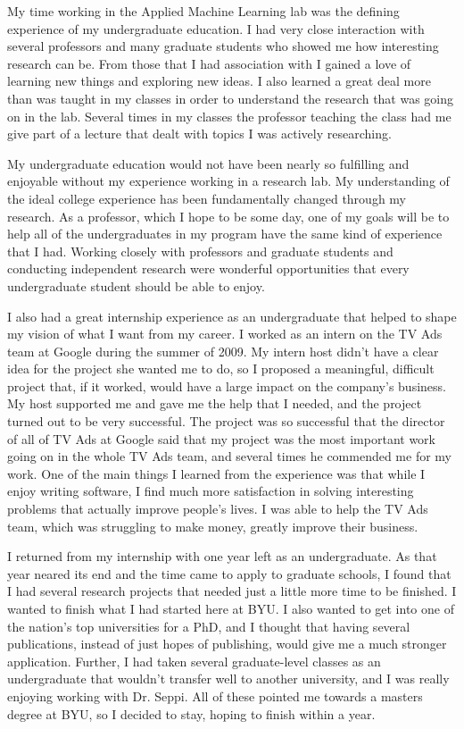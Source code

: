 \documentclass[onecolumn, 12pt]{article}
\begin{document}
My time working in the Applied Machine Learning lab was the defining experience
of my undergraduate education.  I had very close interaction with several
professors and many graduate students who showed me how interesting research
can be.  From those that I had association with I gained a love of learning new
things and exploring new ideas.  I also learned a great deal more than was
taught in my classes in order to understand the research that was going on in
the lab.  Several times in my classes the professor teaching the class had me
give part of a lecture that dealt with topics I was actively researching.  

My undergraduate education would not have been nearly so fulfilling and
enjoyable without my experience working in a research lab.  My understanding of
the ideal college experience has been fundamentally changed through my
research.  As a professor, which I hope to be some day, one of my goals will be
to help all of the undergraduates in my program have the same kind of
experience that I had.  Working closely with professors and graduate students
and conducting independent research were wonderful opportunities that every
undergraduate student should be able to enjoy.

I also had a great internship experience as an undergraduate that helped to
shape my vision of what I want from my career.  I worked as an intern on the TV
Ads team at Google during the summer of 2009.  My intern host didn't have a
clear idea for the project she wanted me to do, so I proposed a meaningful,
difficult project that, if it worked, would have a large impact on the
company's business.  My host supported me and gave me the help that I needed,
and the project turned out to be very successful.  The project was so
successful that the director of all of TV Ads at Google said that my project
was the most important work going on in the whole TV Ads team, and several
times he commended me for my work.  One of the main things I learned from the
experience was that while I enjoy writing software, I find much more
satisfaction in solving interesting problems that actually improve people's
lives.  I was able to help the TV Ads team, which was struggling to make money,
greatly improve their business.

I returned from my internship with one year left as an undergraduate.  As that
year neared its end and the time came to apply to graduate schools, I found
that I had several research projects that needed just a little more time to be
finished.  I wanted to finish what I had started here at BYU.  I also wanted to
get into one of the nation's top universities for a PhD, and I thought that
having several publications, instead of just hopes of publishing, would give me
a much stronger application.  Further, I had taken several graduate-level
classes as an undergraduate that wouldn't transfer well to another university,
and I was really enjoying working with Dr. Seppi.  All of these pointed me
towards a masters degree at BYU, so I decided to stay, hoping to finish within
a year.
\end{document}
